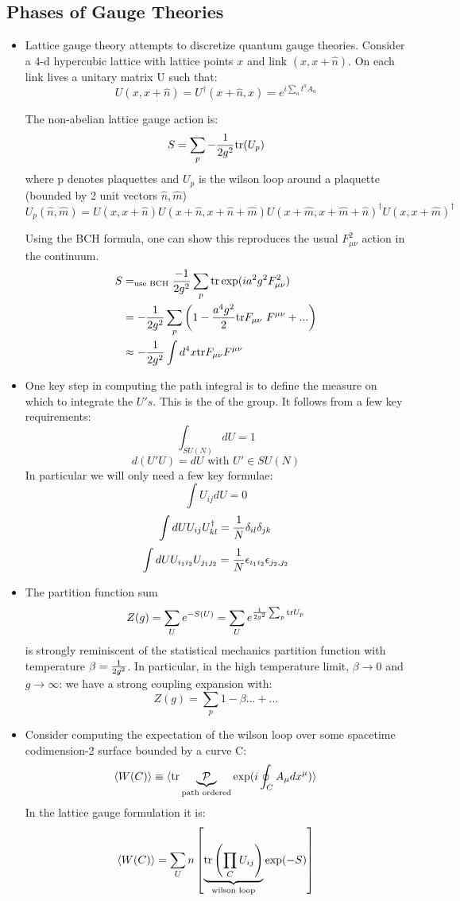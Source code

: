 \documentclass[11pt]{scrartcl}
\begin{document}
\subsection{Phases of Gauge Theories}
\begin{itemize}
	\item Lattice gauge theory attempts to discretize quantum gauge theories.  Consider a 4-d hypercubic lattice with lattice points $x$ and link $(x, x+ \hat{n})$.  On each link lives a unitary matrix U such that:
	\[U(x, x+ \hat{n}) = U^{\dagger} (x+ \hat{n}, x) = e^{i \sum_a t^a A_a} \]
	
	The non-abelian lattice gauge action is:
	\[ S = \sum_{p}-{1 \over 2g^2} \mathrm{tr}(U_p) \]
	 where p denotes plaquettes and $U_p$ is the wilson loop around a plaquette (bounded by 2 unit vectors $\hat{n}, \hat{m}$)
	 \[U_p (\hat{n}, \hat{m}) = U(x, x+\hat{n}) U(x+\hat{n}, x+\hat{n}+\hat{m}) U(x+ \hat{m}, x+\hat{m} + \hat{n})^\dagger U(x, x+ \hat{m})^\dagger  \]
	 
	 Using the BCH formula, one can show this reproduces the usual $F_{\mu \nu}^2$ action in the continuum.
	 \begin{align}
	 	S &=_{\text{use BCH}} {-1 \over 2 g^2} \sum_p \mathrm{tr} \exp(i a^2 g^2 F_{\mu \nu}^2) \\
	 	&= -{1 \over 2 g^2} \sum_p  \left(1 - {a^4 g^2 \over 2} \mathrm{tr} F_{\mu \nu} \ F^{\mu \nu} + ...\right) \\
	 	&\approx -{1 \over 2g^2} \int d^4 x \mathrm{tr} F_{\mu \nu} F^{\mu \nu}
	  \end{align}
	
	\item  One key step in computing the path integral is to define the measure on which to integrate the $U's$. This is the  of the group.  It follows from a few key requirements:
	\[ \int_{SU(N)} dU = 1 \]
	\[ d(U' U) = dU \text{ with } U' \in SU(N) \]
	In particular we will only need a few key formulae:
	\[ \int U_{ij} dU = 0 \]
	\[ \int dU U_{ij} {U^{\dagger}_{kl}}= {1 \over N} \delta_{il} \delta_{jk} \]
	\[\int dU U_{i_1 i_2} U_{j_1 j_2} = {1 \over N}  \epsilon_{i_1 i_2} \epsilon_{j_2, j_2} \]
	
	\item The partition function sum
	\[ Z(g) = \sum_{U} e^{-S(U)} = \sum_U e^{{1 \over 2 g^2} \sum_p \mathrm{tr}U_p} \]
	is strongly reminiscent of the statistical mechanics partition function with temperature $\beta = {1 \over 2 g^2}$.  In particular, in the high temperature limit, $\beta \rightarrow 0$ and $g \rightarrow \infty$: we have a strong coupling expansion with:
	\[ Z(g) = \sum_p 1 - \beta ... + ... \]
	\item Consider computing the expectation of the wilson loop over some spacetime codimension-2 surface bounded by a curve C:
	\[ \braket{W(C)} \equiv \braket{\mathrm{tr} \underbrace{ \mathcal{P}}_{\text{path ordered}} \exp(i \oint_C A_\mu dx^\mu) } \]
	In the lattice gauge formulation it is:
	\[ \braket{W(C)} = \sum_{U}n\left[  \underbrace{\mathrm{tr}  \left(\prod_{C} U_{ij} \right)}_{\text{wilson loop}} \exp(- S) \right] \]
	

\end{itemize}
\end{document}
